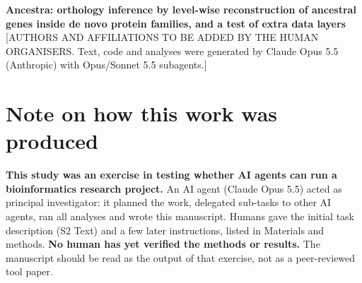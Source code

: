 \documentclass[10pt,letterpaper]{article}
\begin{document}
\vspace*{0.2in}

\begin{flushleft}
{\Large
\textbf{Ancestra: orthology inference by level-wise reconstruction of ancestral genes inside de novo protein families, and a test of extra data layers}
}
\newline
\\
{}[AUTHORS AND AFFILIATIONS TO BE ADDED BY THE HUMAN ORGANISERS. Text, code and analyses were generated by Claude Opus 5.5 (Anthropic) with Opus/Sonnet 5.5 subagents.]
\end{flushleft}

\section*{Note on how this work was produced}
\textbf{This study was an exercise in testing whether AI agents can run a bioinformatics research project.} An AI agent (Claude Opus 5.5) acted as principal investigator: it planned the work, delegated sub-tasks to other AI agents, ran all analyses and wrote this manuscript. Humans gave the initial task description (S2 Text) and a few later instructions, listed in Materials and methods. \textbf{No human has yet verified the methods or results.} The manuscript should be read as the output of that exercise, not as a peer-reviewed tool paper.
\end{document}
